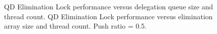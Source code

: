 \begin{figure}[]
\centering
{}
\caption[]{ QD Elimination Lock performance versus delegation queue size and thread count.  QD Elimination Lock performance versus elimination array size and thread count. Push ratio = 0.5.}
\label{fig:final}
\end{figure}
